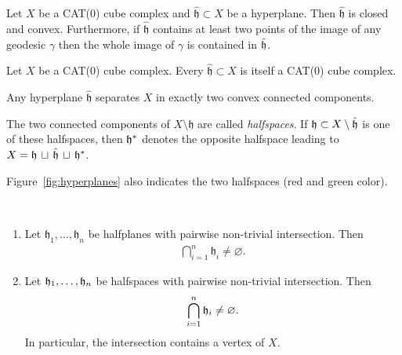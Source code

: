 \begin{prop}
  Let \(X\) be a CAT(0) cube complex and \(\mathfrak{\hat h} \subset X\) be a hyperplane. Then \(\mathfrak{\hat h}\) is closed and convex. Furthermore, if \(\mathfrak{\hat h}\) contains at least two points of the image of any geodesic \(\gamma\) then the whole image of \(\gamma\) is contained in \(\mathfrak{\hat h}\).
\end{prop}

\begin{cor}
  Let \(X\) be a CAT(0) cube complex. Every \(\mathfrak{\hat h} \subset X\) is itself a CAT(0) cube complex.
\end{cor}

\begin{thm}
  Any hyperplane \(\mathfrak{\hat h}\) separates \(X\) in exactly two convex connected components.
\end{thm}

\begin{defin}[Halfspaces]
  The two connected components of \(X \setminus \mathfrak{h}\) are called \emph{halfspaces}. If \(\mathfrak{h} \subset X \setminus \mathfrak{\hat h}\) is one of these halfspaces, then \(\mathfrak{h}^\ast\) denotes the opposite halfspace leading to \(X = \mathfrak{h}\, \sqcup\, \mathfrak{\hat h}\, \sqcup\, \mathfrak{h}^\ast \).
\end{defin}

\begin{bsp}
  Figure~\ref{fig:hyperplanes} also indicates the two halfspaces (red and green color).
\end{bsp}

\begin{thm}\ 
  \label{thm:common-intersection}
  \begin{enumerate} 
  \item Let \(\mathfrak{h}_1, \dots, \mathfrak{h}_n\) be halfplanes with pairwise non-trivial intersection. Then
    \begin{align*}
      \bigcap_{i=1}^n \mathfrak{h}_i \neq \varnothing.
    \end{align*}
  \item Let \(\mathfrak{h}_1, \dots, \mathfrak{h}_n\) be halfspaces with pairwise non-trivial intersection. Then
    \begin{align*}
      \bigcap_{i=1}^n \mathfrak{h}_i \neq \varnothing.
    \end{align*}
    In particular, the intersection contains a vertex of \(X\).
  \end{enumerate}
\end{thm}

